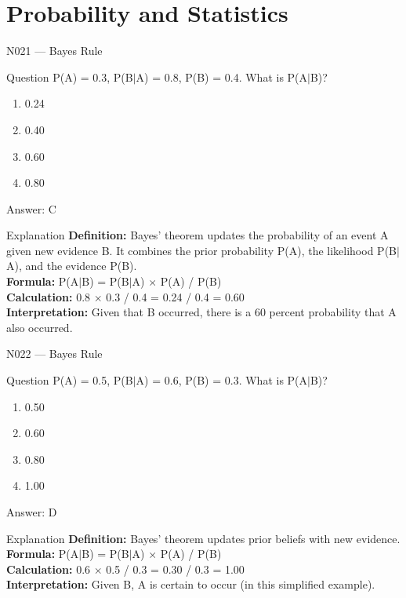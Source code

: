 \documentclass[aspectratio=169,8pt]{beamer}
\begin{document}
	\section{Probability and Statistics}
	
	\begin{frame}{N021 --- Bayes Rule}
		\begin{block}{Question}
			P(A) = 0.3, P(B$|$A) = 0.8, P(B) = 0.4. What is P(A$|$B)?
			\begin{enumerate}
				\item 0.24
				\item 0.40
				\item 0.60
				\item 0.80
			\end{enumerate}
		\end{block}
		\begin{exampleblock}{Answer: C}\end{exampleblock}
		\begin{block}{Explanation}
			\textbf{Definition:} Bayes' theorem updates the probability of an event A given new evidence B. It combines the prior probability P(A), the likelihood P(B$|$A), and the evidence P(B).\\
			\textbf{Formula:} P(A$|$B) = P(B$|$A) $\times$ P(A) / P(B)\\
			\textbf{Calculation:} 0.8 $\times$ 0.3 / 0.4 = 0.24 / 0.4 = 0.60\\
			\textbf{Interpretation:} Given that B occurred, there is a 60 percent probability that A also occurred.
		\end{block}
	\end{frame}
	
	\begin{frame}{N022 --- Bayes Rule}
		\begin{block}{Question}
			P(A) = 0.5, P(B$|$A) = 0.6, P(B) = 0.3. What is P(A$|$B)?
			\begin{enumerate}
				\item 0.50
				\item 0.60
				\item 0.80
				\item 1.00
			\end{enumerate}
		\end{block}
		\begin{exampleblock}{Answer: D}\end{exampleblock}
		\begin{block}{Explanation}
			\textbf{Definition:} Bayes' theorem updates prior beliefs with new evidence.\\
			\textbf{Formula:} P(A$|$B) = P(B$|$A) $\times$ P(A) / P(B)\\
			\textbf{Calculation:} 0.6 $\times$ 0.5 / 0.3 = 0.30 / 0.3 = 1.00\\
			\textbf{Interpretation:} Given B, A is certain to occur (in this simplified example).
		\end{block}
	\end{frame}
	
\end{document}
